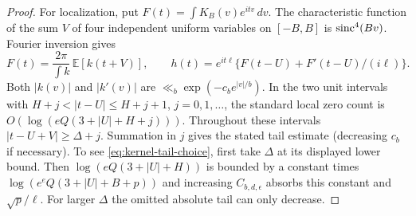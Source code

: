 \begin{proof}
For localization, put $F(t)=\int K_B(v)e^{itv}\,dv$. The characteristic
function of the sum $V$ of four independent uniform variables on $[-B,B]$
is $\operatorname{sinc}^4(Bv)$. Fourier inversion gives
\[
 F(t)=\frac{2\pi}{\int k}\,\mathbb E[k(t+V)],\qquad
 h(t)=e^{it\ell}\{F(t-U)+F'(t-U)/(i\ell)\}.
\]
Both $|k(v)|$ and $|k'(v)|$ are $\ll_b\exp(-c_b e^{|v|/b})$. In the two
unit intervals with $H+j<|t-U|\le H+j+1$, $j=0,1,\ldots$, the standard
local zero count is $O(\log(eQ(3+|U|+H+j)))$. Throughout these intervals
$|t-U+V|\ge \Delta+j$. Summation in $j$ gives the stated tail estimate (decreasing
$c_b$ if necessary). To see \eqref{eq:kernel-tail-choice}, first take $\Delta$
at its displayed lower bound. Then $\log(eQ(3+|U|+H))$ is bounded by a
constant times $\log(e^eQ(3+|U|+B+p))$ and increasing $C_{b,d,\epsilon}$
absorbs this constant and $\sqrt p/\ell$. For larger $\Delta$ the omitted
absolute tail can only decrease.
\end{proof}
